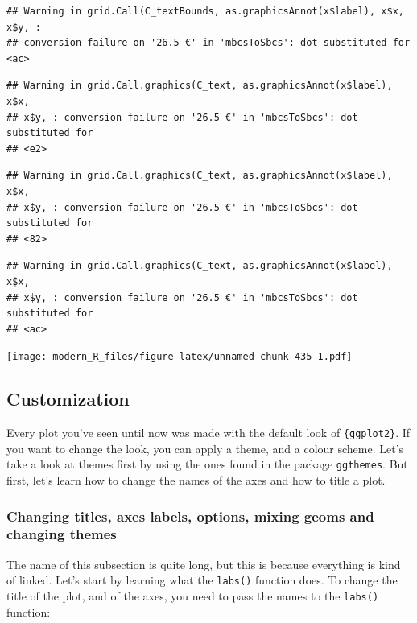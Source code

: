 \documentclass[]{gitbook}
\begin{document}
\begin{verbatim}
## Warning in grid.Call(C_textBounds, as.graphicsAnnot(x$label), x$x, x$y, :
## conversion failure on '26.5 €' in 'mbcsToSbcs': dot substituted for <ac>
\end{verbatim}

\begin{verbatim}
## Warning in grid.Call.graphics(C_text, as.graphicsAnnot(x$label), x$x,
## x$y, : conversion failure on '26.5 €' in 'mbcsToSbcs': dot substituted for
## <e2>
\end{verbatim}

\begin{verbatim}
## Warning in grid.Call.graphics(C_text, as.graphicsAnnot(x$label), x$x,
## x$y, : conversion failure on '26.5 €' in 'mbcsToSbcs': dot substituted for
## <82>
\end{verbatim}

\begin{verbatim}
## Warning in grid.Call.graphics(C_text, as.graphicsAnnot(x$label), x$x,
## x$y, : conversion failure on '26.5 €' in 'mbcsToSbcs': dot substituted for
## <ac>
\end{verbatim}

\texttt{[image: modern\_R\_files/figure-latex/unnamed-chunk-435-1.pdf]}

\hypertarget{customization}{%
\subsection{Customization}\label{customization}}

Every plot you've seen until now was made with the default look of \texttt{\{ggplot2\}}. If you want to change
the look, you can apply a theme, and a colour scheme. Let's take a look at themes first by using the
ones found in the package \texttt{ggthemes}. But first, let's learn how to change the names of the axes
and how to title a plot.

\hypertarget{changing-titles-axes-labels-options-mixing-geoms-and-changing-themes}{%
\subsubsection{Changing titles, axes labels, options, mixing geoms and changing themes}\label{changing-titles-axes-labels-options-mixing-geoms-and-changing-themes}}

The name of this subsection is quite long, but this is because everything is kind of linked. Let's
start by learning what the \texttt{labs()} function does. To change the title of the plot, and of the axes,
you need to pass the names to the \texttt{labs()} function:
\end{document}
